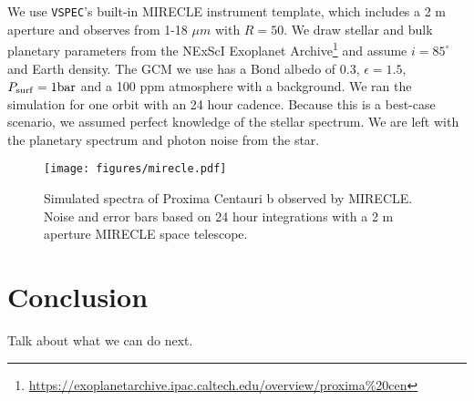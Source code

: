 \documentclass[twocolumn]{aastex631}
\newcommand{\TJ}[1]{\textcolor{tedcommentcolor}{#1}}
\newcommand{\vspec}[1]{\texttt{VSPEC}#1}
\begin{document}
We use \vspec{}'s built-in MIRECLE instrument template, which includes a 2 m aperture and observes from 1-18 $\mu m$ with $R=50$.
We draw stellar and bulk planetary parameters from the NExScI Exoplanet Archive\footnote{\url{https://exoplanetarchive.ipac.caltech.edu/overview/proxima\%20cen}}
and assume $i=85^\circ$ and Earth density. The GCM we use has a Bond albedo of 0.3, $\epsilon=1.5$, $P_{\rm surf} = 1 \text{bar}$ and a 100 ppm  atmosphere with a  background.
We ran the simulation for one orbit with an 24 hour cadence. Because this is a best-case scenario, we assumed perfect knowledge of the stellar spectrum.
We are left with the planetary spectrum and photon noise from the star.

\begin{figure}
    \centering
    \texttt{[image: figures/mirecle.pdf]}
    \caption{
        Simulated spectra of Proxima Centauri b observed by MIRECLE. Noise and error bars based on 24 hour integrations with a 2 m aperture MIRECLE
        space telescope.
        }
    \label{fig:mirecle}
\end{figure}

\section{Conclusion \label{sec:conclusion}}
\TJ{Talk about what we can do next.}


\end{document}
